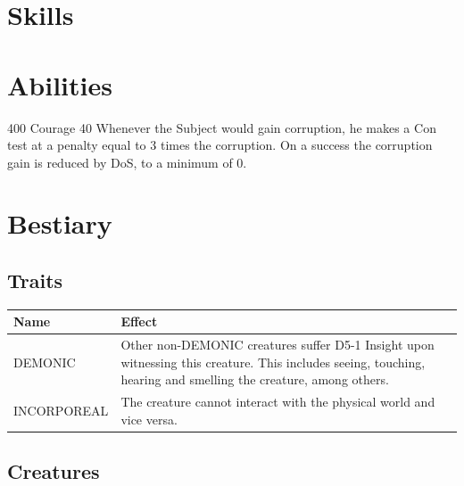 \section{Skills}
\edef\lastskill{x}
\section{Abilities}
	{400}
	{Courage 40}
	{Whenever the Subject would gain corruption,
		he makes a Con test at a penalty
		equal to 3 times the corruption.
		On a success the corruption gain is reduced by DoS, to a minimum of 0.}
\newpage
\section{Bestiary}
\subsection{Traits}
\begin{tabularx}{\columnwidth}{l|X}
	Name & Effect \\ \hline
	DEMONIC & Other non-DEMONIC creatures suffer D5-1 Insight upon witnessing this creature. 
	This includes seeing, touching, hearing and smelling the creature, among others. \\
	\hline
	INCORPOREAL & The creature cannot interact with the physical world and vice versa.
\end{tabularx}

\subsection{Creatures}
